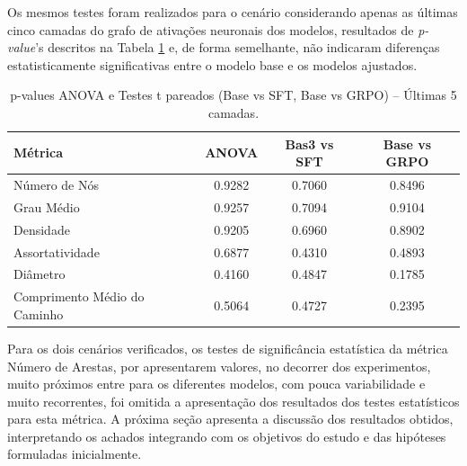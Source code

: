 Os mesmos testes foram realizados para o cenário considerando apenas as últimas cinco camadas do grafo de ativações neuronais dos modelos, resultados de \textit{p-value}'s descritos na Tabela \ref{tab:anova-ttest-lastfive} e, de forma semelhante, não indicaram diferenças estatisticamente significativas entre o modelo base e os modelos ajustados.

\begin{table}[ht]
\centering
\caption{p-values ANOVA e Testes t pareados (Base vs SFT, Base vs GRPO) – Últimas 5 camadas.}
\label{tab:anova-ttest-lastfive}
\begin{tabular}{|l|c|c|c|}
\hline
Métrica & ANOVA & Bas3 vs SFT & Base vs GRPO \\
\hline
Número de Nós & 0.9282 & 0.7060 & 0.8496 \\
Grau Médio & 0.9257 & 0.7094 & 0.9104 \\
Densidade & 0.9205 & 0.6960 & 0.8902 \\
Assortatividade & 0.6877 & 0.4310 & 0.4893 \\
Diâmetro & 0.4160 & 0.4847 & 0.1785 \\
Comprimento Médio do Caminho & 0.5064 & 0.4727 & 0.2395 \\
\hline
\end{tabular}
\end{table}

Para os dois cenários verificados, os testes de significância estatística da métrica Número de Arestas, por apresentarem valores, no decorrer dos experimentos, muito próximos entre para os diferentes modelos, com pouca variabilidade e muito recorrentes, foi omitida a apresentação dos resultados dos testes estatísticos para esta métrica. A próxima seção apresenta a discussão dos resultados obtidos, interpretando os achados integrando com os objetivos do estudo e das hipóteses formuladas inicialmente.
